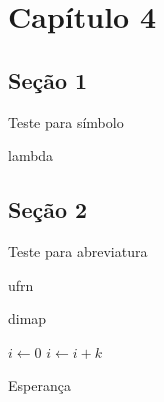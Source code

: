 \chapter{Capítulo 4}

\section{Seção 1}

Teste para símbolo

\ac{lambda}


\section{Seção 2}

Teste para abreviatura 

\ac{ufrn}

\ac{dimap}


\begin{breakablealgorithm}
\begin{algorithmic}[1]
    \State $i\gets 0$
\Else
        \State $i\gets i+k$
    \EndIf
\EndIf
\end{algorithmic}
\caption{Esperança}
\label{alg1}
\end{breakablealgorithm}